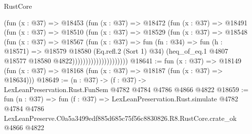 \begin{lexlean}{RustCore}
\begin{coremodule}
                            (fun (x : @37) =>
                            @18453
                              (fun (x : @37) =>
                              @18472
                                (fun (x : @37) =>
                                @18491
                                  (fun (x : @37) =>
                                  @18510
                                    (fun (x : @37) =>
                                    @18529
                                      (fun (x : @37) =>
                                      @18548
                                        (fun (x : @37) =>
                                        @18567
                                          (fun (x : @37) =>
                                          fun (fn : @34) =>
                                          fun (h : @18571) =>
                                          @18579
                                            @18580
                                            (Eq.refl.{2} (Sort 1) @34)
                                            (heq_of_eq.{1}
                                              @4807
                                              @18577
                                              @18580
                                              @4822)))))))))))))))))))))
@18641 := fun (x : @37) =>
  @18149 (fun (x : @37) => @18168 (fun (x : @37) => @18187 (fun (x : @37) => @18634)))
@18649 := (n : @37) -> (f : @37) -> LexLeanPreservation.Rust.FunSem @4782 @4784 @4786 @4866 @4822
@18659 := fun (n : @37) =>
  fun (f : @37) =>
  LexLeanPreservation.Rust.simulate
    @4782
    @4784
    @4786
    LexLeanPreserve.C0a5a3499edf885d685c75f56c8830826.R8.RustCore.crate_ok
    @4866
    @4822
\end{coremodule}
\end{lexlean}
